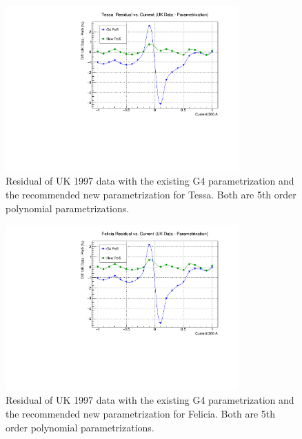 \documentclass[12pt]{article}
\begin{document}
\begin{figure}[!h]
\centering
\includegraphics[width=0.8\textwidth]{Tessa_G4_UK_residual.pdf}
\caption{\label{fig:Tessa_G4_UK_res} Residual of UK 1997 data with the existing G4 parametrization and the recommended new parametrization for Tessa. Both are 5th order polynomial parametrizations.}
\end{figure}
\begin{figure}[!h]
\centering
\includegraphics[width=0.8\textwidth]{Felicia_G4_UK_residual.pdf}
\caption{\label{fig:Felicia_G4_UK_res} Residual of UK 1997 data with the existing G4 parametrization and the recommended new parametrization for Felicia. Both are 5th order polynomial parametrizations.}
\end{figure}
\FloatBarrier
\end{document}
